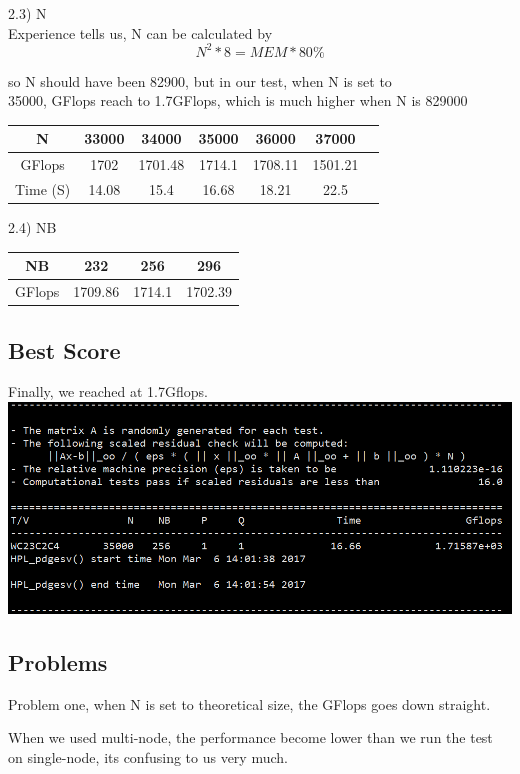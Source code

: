 \documentclass[conference,compsoc]{appendix/report}
\begin{document}
2.3) N \\
Experience tells us, N can be calculated by 
\[ N^2 * 8 = MEM * 80\% \]

so N should have been  82900, but in our test, when N is set to \\
35000, GFlops reach to 1.7GFlops, which is much higher when N is 829000 \\

\begin{tabular}{|c|c|c|c|c|c|c|}
\hline
N &  33000 & 34000 & 35000 & 36000 & 37000  \\
\hline
GFlops  &1702 &1701.48 &1714.1 &1708.11 &1501.21 \\
\hline
Time (S) &14.08 &15.4 &16.68 &18.21 &22.5 \\
\hline 
\end{tabular}
\newline
\newline
\par
2.4) NB \\
\par
\begin{tabular}{|c|c|c|c|}
\hline
NB & 232 & 256 & 296 \\
\hline
GFlops & 1709.86 & 1714.1 & 1702.39 \\
\hline
\end{tabular}

\subsection{Best Score}
Finally, we reached at 1.7Gflops.  \\
\includegraphics[scale=0.35]{appendix/hpl.png}
\subsection{Problems}
Problem one, when N is set to theoretical size, the GFlops goes down straight. 

When we used multi-node, the performance become lower than we run the test on single-node, its confusing to us very much.
\end{document}
